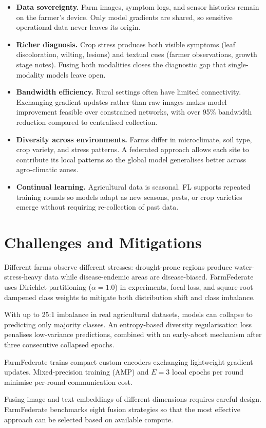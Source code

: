 \documentclass[12pt, a4paper, oneside]{Thesis}
\begin{document}
\begin{itemize}[leftmargin=1.2em]
  \item \textbf{Data sovereignty.} Farm images, symptom logs, and sensor histories remain on the farmer's device. Only model gradients are shared, so sensitive operational data never leaves its origin.
  \item \textbf{Richer diagnosis.} Crop stress produces both visible symptoms (leaf discoloration, wilting, lesions) and textual cues (farmer observations, growth stage notes). Fusing both modalities closes the diagnostic gap that single-modality models leave open.
  \item \textbf{Bandwidth efficiency.} Rural settings often have limited connectivity. Exchanging gradient updates rather than raw images makes model improvement feasible over constrained networks, with over 95\% bandwidth reduction compared to centralised collection.
  \item \textbf{Diversity across environments.} Farms differ in microclimate, soil type, crop variety, and stress patterns. A federated approach allows each site to contribute its local patterns so the global model generalises better across agro-climatic zones.
  \item \textbf{Continual learning.} Agricultural data is seasonal. FL supports repeated training rounds so models adapt as new seasons, pests, or crop varieties emerge without requiring re-collection of past data.
\end{itemize}

\section{Challenges and Mitigations}

\begin{description}[leftmargin=1.2em]
  \item[Non-IID and unbalanced data.] Different farms observe different stresses: drought-prone regions produce water-stress-heavy data while disease-endemic areas are disease-biased. FarmFederate uses Dirichlet partitioning ($\alpha{=}1.0$) in experiments, focal loss, and square-root dampened class weights to mitigate both distribution shift and class imbalance.
  \item[Class collapse.] With up to 25:1 imbalance in real agricultural datasets, models can collapse to predicting only majority classes. An entropy-based diversity regularisation loss penalises low-variance predictions, combined with an early-abort mechanism after three consecutive collapsed epochs.
  \item[Communication limits.] FarmFederate trains compact custom encoders exchanging lightweight gradient updates. Mixed-precision training (AMP) and $E{=}3$ local epochs per round minimise per-round communication cost.
  \item[Multimodal alignment.] Fusing image and text embeddings of different dimensions requires careful design. FarmFederate benchmarks eight fusion strategies so that the most effective approach can be selected based on available compute.
\end{description}
\end{document}
